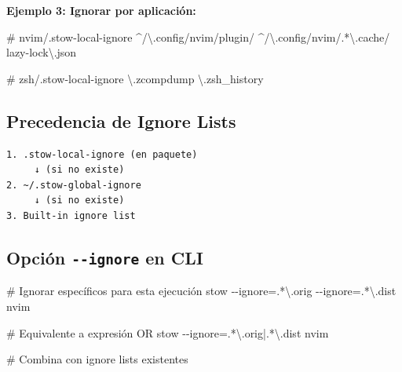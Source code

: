 \documentclass[
  doc,
  floatsintext,
  longtable,
  a4paper,
  nolmodern,
  notxfonts,
  notimes,
  12pt,
  colorlinks=true,linkcolor=blue,citecolor=blue,urlcolor=blue]{apa7}
\newenvironment{Shaded}{\begin{snugshade}}{\end{snugshade}}
\newcommand{\AttributeTok}[1]{\textcolor[rgb]{0.40,0.45,0.13}{#1}}
\newcommand{\BuiltInTok}[1]{\textcolor[rgb]{0.00,0.23,0.31}{#1}}
\newcommand{\CommentTok}[1]{\textcolor[rgb]{0.37,0.37,0.37}{#1}}
\newcommand{\DataTypeTok}[1]{\textcolor[rgb]{0.68,0.00,0.00}{#1}}
\newcommand{\ExtensionTok}[1]{\textcolor[rgb]{0.00,0.23,0.31}{#1}}
\newcommand{\NormalTok}[1]{\textcolor[rgb]{0.00,0.23,0.31}{#1}}
\newcommand{\OperatorTok}[1]{\textcolor[rgb]{0.37,0.37,0.37}{#1}}
\newcommand{\PreprocessorTok}[1]{\textcolor[rgb]{0.68,0.00,0.00}{#1}}
\newcommand{\StringTok}[1]{\textcolor[rgb]{0.13,0.47,0.30}{#1}}
\begin{document}
\begin{Shaded}
\end{Shaded}

\textbf{Ejemplo 3: Ignorar por aplicación:}

\begin{Shaded}
\begin{Highlighting}[]
\CommentTok{\# nvim/.stow{-}local{-}ignore}
\ExtensionTok{\^{}/\textbackslash{}.config/nvim/plugin/}
\ExtensionTok{\^{}/\textbackslash{}.config/nvim/.*\textbackslash{}.cache/}
\ExtensionTok{lazy{-}lock\textbackslash{}.json}

\CommentTok{\# zsh/.stow{-}local{-}ignore}
\ExtensionTok{\textbackslash{}.zcompdump}
\ExtensionTok{\textbackslash{}.zsh\_history}
\end{Highlighting}
\end{Shaded}

\subsection{Precedencia de Ignore
Lists}\label{precedencia-de-ignore-lists}

\begin{verbatim}
1. .stow-local-ignore (en paquete)
     ↓ (si no existe)
2. ~/.stow-global-ignore
     ↓ (si no existe)
3. Built-in ignore list
\end{verbatim}

\subsection{\texorpdfstring{Opción \texttt{-\/-ignore} en
CLI}{Opción -\/-ignore en CLI}}\label{opciuxf3n---ignore-en-cli}

\begin{Shaded}
\begin{Highlighting}[]
\CommentTok{\# Ignorar específicos para esta ejecución}
\ExtensionTok{stow} \AttributeTok{{-}{-}ignore}\OperatorTok{=}\StringTok{\textquotesingle{}.*\textbackslash{}.orig\textquotesingle{}} \AttributeTok{{-}{-}ignore}\OperatorTok{=}\StringTok{\textquotesingle{}.*\textbackslash{}.dist\textquotesingle{}}\NormalTok{ nvim}

\CommentTok{\# Equivalente a expresión OR}
\ExtensionTok{stow} \AttributeTok{{-}{-}ignore}\OperatorTok{=}\StringTok{\textquotesingle{}.*\textbackslash{}.orig|.*\textbackslash{}.dist\textquotesingle{}}\NormalTok{ nvim}

\CommentTok{\# Combina con ignore lists existentes}
\end{Highlighting}
\end{Shaded}
\end{document}
